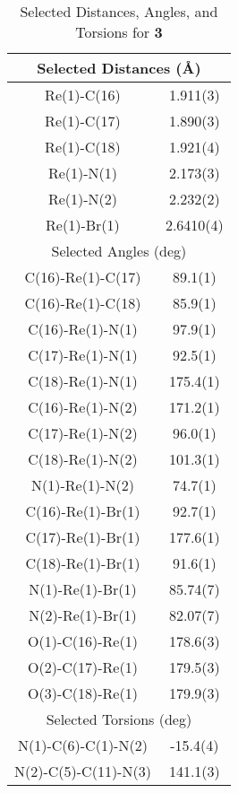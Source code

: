 \begin{table}[htbp]
  \caption{Selected Distances, Angles, and Torsions for \textbf{3}}
  \centering
    \begin{tabular}{cc}
    \toprule
    \multicolumn{2}{c}{Selected Distances (\r{A})} \\
    \midrule
    Re(1)-C(16) & 1.911(3) \\
    Re(1)-C(17) & 1.890(3) \\
    Re(1)-C(18) & 1.921(4) \\
    Re(1)-N(1) & 2.173(3) \\
    Re(1)-N(2) & 2.232(2) \\
    Re(1)-Br(1) & 2.6410(4) \\ \midrule
    \multicolumn{2}{c}{Selected Angles (deg)} \\ \midrule
    C(16)-Re(1)-C(17) & 89.1(1) \\
    C(16)-Re(1)-C(18) & 85.9(1) \\
    C(16)-Re(1)-N(1) & 97.9(1) \\
    C(17)-Re(1)-N(1) & 92.5(1) \\
    C(18)-Re(1)-N(1) & 175.4(1) \\
    C(16)-Re(1)-N(2) & 171.2(1) \\
    C(17)-Re(1)-N(2) & 96.0(1) \\
    C(18)-Re(1)-N(2) & 101.3(1) \\
    N(1)-Re(1)-N(2) & 74.7(1) \\
    C(16)-Re(1)-Br(1) & 92.7(1) \\
    C(17)-Re(1)-Br(1) & 177.6(1) \\
    C(18)-Re(1)-Br(1) & 91.6(1) \\
    N(1)-Re(1)-Br(1) & 85.74(7) \\
    N(2)-Re(1)-Br(1) & 82.07(7) \\
    O(1)-C(16)-Re(1) & 178.6(3) \\
    O(2)-C(17)-Re(1) & 179.5(3) \\
    O(3)-C(18)-Re(1) & 179.9(3) \\ \midrule
    \multicolumn{2}{c}{Selected Torsions (deg)} \\ \midrule
    N(1)-C(6)-C(1)-N(2) & -15.4(4) \\
    N(2)-C(5)-C(11)-N(3) & 141.1(3) \\
    \bottomrule
    \end{tabular}%
  \label{tab.da3}%
\end{table}%


